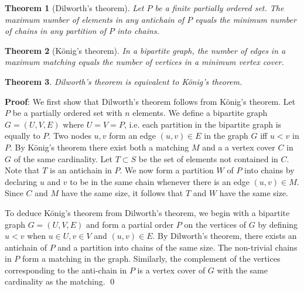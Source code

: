\documentclass[12pt]{amsart}
\newtheorem{thm}{Theorem}
\theoremstyle{definition}
\begin{document}
\begin{thm}[Dilworth's theorem]
\label{thm:Dilworth}
Let $P$ be a finite partially ordered set. The maximum number of elements in any antichain of $P$ equals the minimum number of chains in any partition of $P$ into chains.
\end{thm}
\begin{thm}[K\"{o}nig's theorem]
\label{thm:konig}
In a bipartite graph, the number of edges in a maximum matching equals
the number of vertices in a minimum vertex cover.
\end{thm}
\begin{thm}
\label{thm:dilko}
Dilworth's theorem is equivalent to K\"{o}nig's theorem.
\end{thm}
{\bf Proof}: We first show that Dilworth's theorem follows from
K\"{o}nig's theorem. Let $P$ be a partially ordered set with $n$
elements. We define a bipartite graph $G=(U,V,E)$ where
$U=V=P$, i.e. each partition in the bipartite graph is equally to
$P$. Two nodes $u,v$ form an edge $(u,v) \in E$ in the graph $G$ iff
$u<v$ in $P$. By K\"{o}nig's theorem there exist both a matching $M$ and a
a vertex cover $C$ in $G$ of the same cardinality. Let $T \subset
S$ be the set of elements not contained in $C$. Note that $T$ is an
antichain in $P$. We now form a partition $W$ of $P$ into chains by declaring $u$ and
$v$ to be in the same chain whenever there is an edge $(u,v) \in
M$. Since $C$ and $M$ have the same size, it follows that $T$ and $W$
have the same size.

To deduce K\"{o}nig's theorem from Dilworth's theorem, we begin with a
bipartite graph $G=(U,V,E)$ and form a partial order $P$ on the
vertices of $G$ by defining $u<v$ when $u \in U, v \in V$ and $(u,v)
\in E$. By Dilworth's theorem, there exists an antichain of $P$ and a
partition into chains of the same size. The non-trivial chains in $P$
form a matching in the graph. Similarly, the complement of the
vertices corresponding to the anti-chain in $P$ is a vertex cover of
$G$ with the same cardinality as the matching.  \qed
\end{document}
